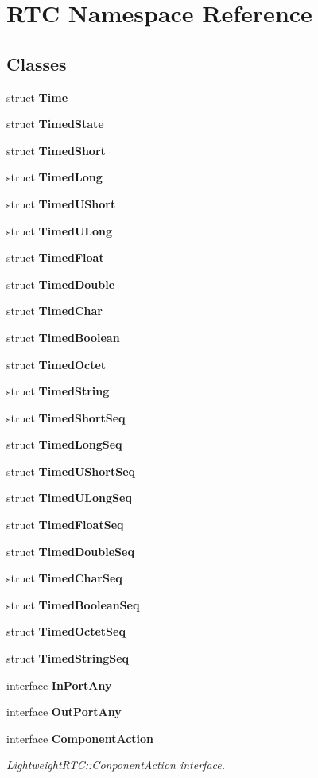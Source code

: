\section{RTC Namespace Reference}
\label{namespaceRTC}


\subsection*{Classes}
\begin{CompactItemize}
\item 
struct {\bf Time}
\item 
struct {\bf Timed\-State}
\item 
struct {\bf Timed\-Short}
\item 
struct {\bf Timed\-Long}
\item 
struct {\bf Timed\-UShort}
\item 
struct {\bf Timed\-ULong}
\item 
struct {\bf Timed\-Float}
\item 
struct {\bf Timed\-Double}
\item 
struct {\bf Timed\-Char}
\item 
struct {\bf Timed\-Boolean}
\item 
struct {\bf Timed\-Octet}
\item 
struct {\bf Timed\-String}
\item 
struct {\bf Timed\-Short\-Seq}
\item 
struct {\bf Timed\-Long\-Seq}
\item 
struct {\bf Timed\-UShort\-Seq}
\item 
struct {\bf Timed\-ULong\-Seq}
\item 
struct {\bf Timed\-Float\-Seq}
\item 
struct {\bf Timed\-Double\-Seq}
\item 
struct {\bf Timed\-Char\-Seq}
\item 
struct {\bf Timed\-Boolean\-Seq}
\item 
struct {\bf Timed\-Octet\-Seq}
\item 
struct {\bf Timed\-String\-Seq}
\item 
interface {\bf In\-Port\-Any}
\item 
interface {\bf Out\-Port\-Any}
\item 
interface {\bf Component\-Action}
\begin{CompactList}\small\item\em Lightweight\-RTC::Conponent\-Action interface. \item\end{CompactList}\item 

\end{CompactItemize}
